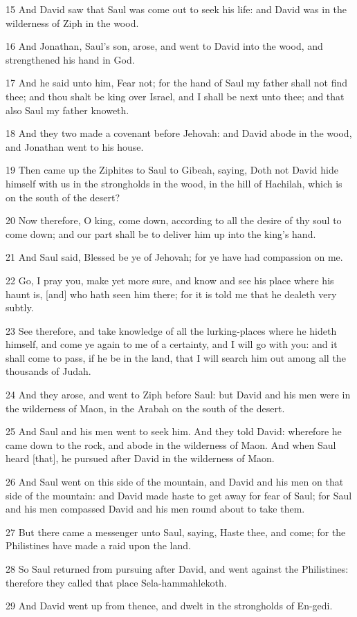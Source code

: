 \par 15 And David saw that Saul was come out to seek his life: and David was in the wilderness of Ziph in the wood.
\par 16 And Jonathan, Saul's son, arose, and went to David into the wood, and strengthened his hand in God.
\par 17 And he said unto him, Fear not; for the hand of Saul my father shall not find thee; and thou shalt be king over Israel, and I shall be next unto thee; and that also Saul my father knoweth.
\par 18 And they two made a covenant before Jehovah: and David abode in the wood, and Jonathan went to his house.
\par 19 Then came up the Ziphites to Saul to Gibeah, saying, Doth not David hide himself with us in the strongholds in the wood, in the hill of Hachilah, which is on the south of the desert?
\par 20 Now therefore, O king, come down, according to all the desire of thy soul to come down; and our part shall be to deliver him up into the king's hand.
\par 21 And Saul said, Blessed be ye of Jehovah; for ye have had compassion on me.
\par 22 Go, I pray you, make yet more sure, and know and see his place where his haunt is, [and] who hath seen him there; for it is told me that he dealeth very subtly.
\par 23 See therefore, and take knowledge of all the lurking-places where he hideth himself, and come ye again to me of a certainty, and I will go with you: and it shall come to pass, if he be in the land, that I will search him out among all the thousands of Judah.
\par 24 And they arose, and went to Ziph before Saul: but David and his men were in the wilderness of Maon, in the Arabah on the south of the desert.
\par 25 And Saul and his men went to seek him. And they told David: wherefore he came down to the rock, and abode in the wilderness of Maon. And when Saul heard [that], he pursued after David in the wilderness of Maon.
\par 26 And Saul went on this side of the mountain, and David and his men on that side of the mountain: and David made haste to get away for fear of Saul; for Saul and his men compassed David and his men round about to take them.
\par 27 But there came a messenger unto Saul, saying, Haste thee, and come; for the Philistines have made a raid upon the land.
\par 28 So Saul returned from pursuing after David, and went against the Philistines: therefore they called that place Sela-hammahlekoth.
\par 29 And David went up from thence, and dwelt in the strongholds of En-gedi.

